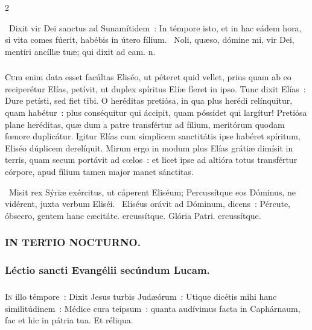 \documentclass[9pt,twoside]{extarticle}
\begin{document}
\begin{multicols}{2}
{\begin{tightlist}{}
\item {}~Dixit vir Dei sanctus ad Sunamítidem~: \textred{*} In témpore isto, et in hac eádem hora, si vita comes fúerit, habébis in útero fílium. ~Noli, quæso, dómine mi, vir Dei, mentíri ancíllæ tuæ; qui dixit ad eam. n.
\end{tightlist}

\subsubsection*{\center {}}
\lettrine{C}um enim data esset facúltas Eliséo, ut péteret quid vellet, prius quam ab eo reciperétur Elías, petívit, ut duplex spíritus Elíæ fíeret in ipso. Tunc dixit Elías~: Dure petísti, sed fiet tibi. O heréditas pretiósa, in qua plus herédi relínquitur, quam habétur~: plus conséquitur qui áccipit, quam póssidet qui largítur! Pretiósa plane heréditas, quæ dum a patre transfértur ad fílium, meritórum quodam fœnore duplicátur. Igitur Elías cum símplicem sanctitátis ipse habéret spíritum, Eliséo dúplicem derelíquit. Mirum ergo in modum plus Elías grátiæ dimísit in terris, quam secum portávit ad cœlos~: et licet ipse ad altióra totus transfértur córpore, apud fílium tamen major manet sánctitas.

\begin{tightlist}{}
\item {}~Misit rex Sýriæ exércitus, ut cáperent Eliséum; \textred{*} Percussítque eos Dóminus, ne vidérent, juxta verbum Eliséi. ~Eliséus orávit ad Dóminum, dicens~: Pércute, óbsecro, gentem hanc cæcitáte. ercussítque. Glória Patri. ercussítque.
\end{tightlist}

\subsubsection*{\center \textsc{IN TERTIO NOCTURNO.}}
\subsubsection*{\center Léctio sancti Evangélii secúndum Lucam.}
\subsubsection*{\center {}}
\lettrine{I}n illo témpore~: Dixit Jesus turbis Judæórum~: Utique dicétis mihi hanc similitúdinem~: Médice cura teípsum~: quanta audívimus facta in Caphárnaum, fac et hic in pátria tua. Et réliqua.

}
\end{multicols}
\end{document}
